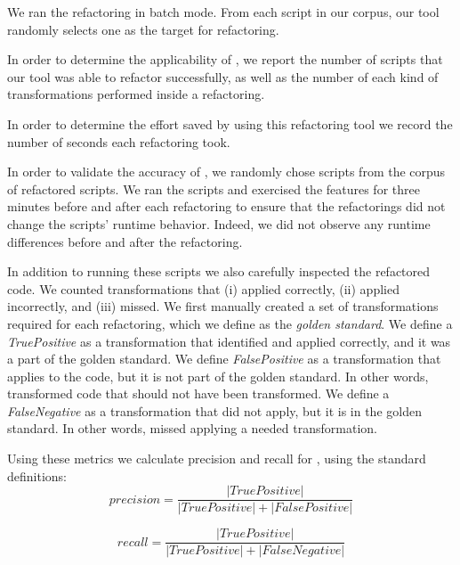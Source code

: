 \documentclass{sigplanconf}
\begin{document}

We ran the refactoring in batch mode. From each script in our corpus, our tool randomly selects one \NC{} as the target for refactoring. 

In order to determine the applicability of \tool, we report the number of scripts that our tool was able to refactor successfully, as well as the number of each kind of transformations performed inside a refactoring.



In order to determine the effort saved by using this refactoring tool we record the number of seconds each refactoring took. 



In order to validate the accuracy of \tool, we randomly chose \numManual scripts from the corpus of \numScripts refactored scripts. We ran the scripts and exercised the features for three minutes before and after each refactoring to ensure that the refactorings did not change the scripts' runtime behavior. Indeed, we did not observe any runtime differences before and after the refactoring. 

In addition to running these \numManual scripts we also carefully inspected the refactored code. We counted transformations that \tool
(i) applied correctly, (ii) applied incorrectly, and (iii) missed. We first manually created a set of transformations required for each refactoring, which we define as the \emph{golden standard}. We define a {\it TruePositive} as a transformation that \tool identified and applied correctly, and it was a part of the golden standard. 
We define {\it FalsePositive} as a transformation that \tool applies to the code, but it is not part of the golden standard. In other words, \tool transformed code that should not have been transformed.
We define a {\it FalseNegative} as a transformation that \tool did not apply, but it is in the golden standard. In other words, \tool missed applying a needed transformation.
 
 Using these metrics we calculate precision and recall for \tool, using the standard definitions:
\[precision = \frac{|True Positive|}{|True Positive|+|False Positive|}\]

\[recall = \frac{|True Positive|}{|True Positive|+|False Negative|}\]
\end{document}
